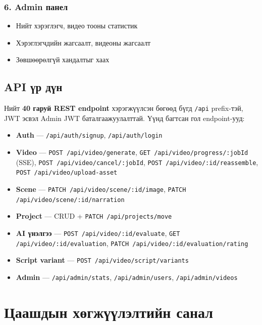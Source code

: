 \subsubsection*{6. Admin панел}
\begin{itemize}
  \item Нийт хэрэглэгч, видео тооны статистик
  \item Хэрэглэгчдийн жагсаалт, видеоны жагсаалт
  \item Зөвшөөрөлгүй хандалтыг хаах
\end{itemize}

\subsection{API үр дүн}

Нийт \textbf{40 гаруй REST endpoint} хэрэгжүүлсэн бөгөөд бүгд \texttt{/api} prefix-тэй, JWT эсвэл Admin JWT баталгаажуулалттай. Үүнд багтсан гол endpoint-ууд:

\begin{itemize}
  \item \textbf{Auth} --- \texttt{/api/auth/signup}, \texttt{/api/auth/login}
  \item \textbf{Video} --- \texttt{POST /api/video/generate}, \texttt{GET /api/video/progress/:jobId} (SSE), \texttt{POST /api/video/cancel/:jobId}, \texttt{POST /api/video/:id/reassemble}, \texttt{POST /api/video/upload-asset}
  \item \textbf{Scene} --- \texttt{PATCH /api/video/scene/:id/image}, \texttt{PATCH /api/video/scene/:id/narration}
  \item \textbf{Project} --- CRUD + \texttt{PATCH /api/projects/move}
  \item \textbf{AI үнэлгээ} --- \texttt{POST /api/video/:id/evaluate}, \texttt{GET /api/video/:id/evaluation}, \texttt{PATCH /api/video/:id/evaluation/rating}
  \item \textbf{Script variant} --- \texttt{POST /api/video/script/variants}
  \item \textbf{Admin} --- \texttt{/api/admin/stats}, \texttt{/api/admin/users}, \texttt{/api/admin/videos}
\end{itemize}

\section{Цаашдын хөгжүүлэлтийн санал}

